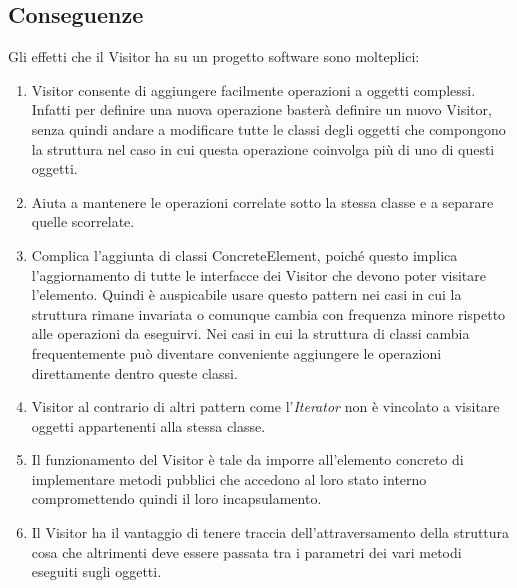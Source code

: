 \subsection{Conseguenze}

Gli effetti che il Visitor ha su un progetto software sono molteplici:

\begin{enumerate}
\item Visitor consente di aggiungere facilmente operazioni a oggetti complessi. Infatti per definire una nuova operazione basterà definire un nuovo Visitor, senza quindi andare a modificare tutte le classi degli oggetti che compongono la struttura nel caso in cui questa operazione coinvolga più di uno di questi oggetti.
\item Aiuta a mantenere le operazioni correlate sotto la stessa classe e a separare quelle scorrelate.
\item Complica l'aggiunta di classi ConcreteElement, poiché questo implica l'aggiornamento di tutte le interfacce dei Visitor che devono poter visitare l'elemento. Quindi è auspicabile usare questo pattern nei casi in cui la struttura rimane invariata o comunque cambia con frequenza minore rispetto alle operazioni da eseguirvi. Nei casi in cui la struttura di classi cambia frequentemente può diventare conveniente aggiungere le operazioni direttamente dentro queste classi.
\item Visitor al contrario di altri pattern come l'\textit{Iterator} non è vincolato a visitare oggetti appartenenti alla stessa classe.
\item Il funzionamento del Visitor è tale da imporre all'elemento concreto di implementare metodi pubblici che accedono al loro stato interno compromettendo quindi il loro incapsulamento.
\item Il Visitor ha il vantaggio di tenere traccia dell'attraversamento della struttura cosa che altrimenti deve essere passata tra i parametri dei vari metodi eseguiti sugli oggetti.
\end{enumerate}


 
